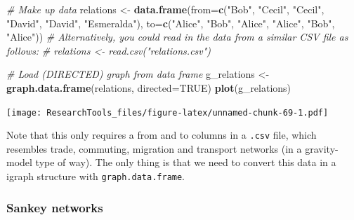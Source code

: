 \documentclass[]{article}
\newenvironment{Shaded}{\begin{snugshade}}{\end{snugshade}}
\newcommand{\KeywordTok}[1]{\textcolor[rgb]{0.13,0.29,0.53}{\textbf{#1}}}
\newcommand{\DataTypeTok}[1]{\textcolor[rgb]{0.13,0.29,0.53}{#1}}
\newcommand{\StringTok}[1]{\textcolor[rgb]{0.31,0.60,0.02}{#1}}
\newcommand{\CommentTok}[1]{\textcolor[rgb]{0.56,0.35,0.01}{\textit{#1}}}
\newcommand{\OtherTok}[1]{\textcolor[rgb]{0.56,0.35,0.01}{#1}}
\newcommand{\NormalTok}[1]{#1}
\theoremstyle{definition}
\theoremstyle{definition}
\theoremstyle{definition}
\theoremstyle{remark}
\begin{document}
\begin{Shaded}
\begin{Highlighting}[]
\CommentTok{# Make up data}
\NormalTok{relations <-}\StringTok{ }\KeywordTok{data.frame}\NormalTok{(}\DataTypeTok{from=}\KeywordTok{c}\NormalTok{(}\StringTok{"Bob"}\NormalTok{, }\StringTok{"Cecil"}\NormalTok{, }\StringTok{"Cecil"}\NormalTok{, }\StringTok{"David"}\NormalTok{, }\StringTok{"David"}\NormalTok{, }\StringTok{"Esmeralda"}\NormalTok{),}
                        \DataTypeTok{to=}\KeywordTok{c}\NormalTok{(}\StringTok{"Alice"}\NormalTok{, }\StringTok{"Bob"}\NormalTok{, }\StringTok{"Alice"}\NormalTok{, }\StringTok{"Alice"}\NormalTok{, }\StringTok{"Bob"}\NormalTok{, }\StringTok{"Alice"}\NormalTok{))}
\CommentTok{# Alternatively, you could read in the data from a similar CSV file as follows:}
\CommentTok{# relations <- read.csv("relations.csv")}

\CommentTok{# Load (DIRECTED) graph from data frame }
\NormalTok{g_relations <-}\StringTok{ }\KeywordTok{graph.data.frame}\NormalTok{(relations, }\DataTypeTok{directed=}\OtherTok{TRUE}\NormalTok{)}
\KeywordTok{plot}\NormalTok{(g_relations)}
\end{Highlighting}
\end{Shaded}

\texttt{[image: ResearchTools\_files/figure-latex/unnamed-chunk-69-1.pdf]}

Note that this only requires a from and to columns in a \texttt{.csv}
file, which resembles trade, commuting, migration and transport networks
(in a gravity-model type of way). The only thing is that we need to
convert this data in a igraph structure with \texttt{graph.data.frame}.

\subsubsection{Sankey networks}\label{sankey-networks}
\end{document}
